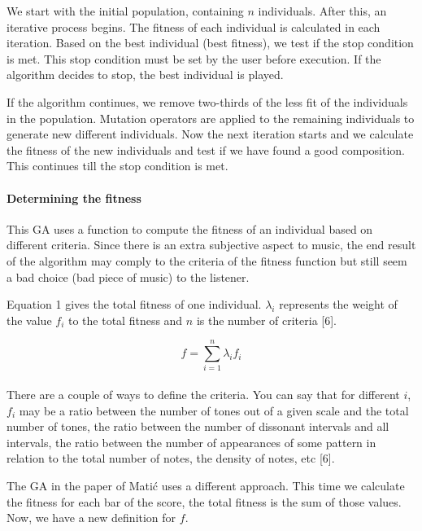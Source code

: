 \documentclass[12pt]{article}
\begin{document}
We start with the initial population, containing $n$ individuals. After this, an iterative process begins. The fitness of each individual is calculated in each iteration. Based on the best individual (best fitness), we test if the stop condition is met. This stop condition must be set by the user before execution. If the algorithm decides to stop, the best individual is played.
\newline

If the algorithm continues, we remove two-thirds of the less fit of the individuals in the population. Mutation operators are applied to the remaining individuals to generate new different individuals. Now the next iteration starts and we calculate the fitness of the new individuals and test if we have found a good composition.
This continues till the stop condition is met.
\newpage

\paragraph{Determining the fitness}

This GA uses a function to compute the fitness of an individual based on different criteria. Since there is an extra subjective aspect to music, the end result of the algorithm may comply to the criteria of the fitness function but still seem a bad choice (bad piece of music) to the listener. 
\newline

Equation 1 gives the total fitness of one individual. $\lambda_i$ represents the weight of the value $f_i$ to the total fitness and $n$ is the number of criteria [6].

\begin{equation}
f = \sum_{i = 1}^{n}\lambda_i f_i
\end{equation}
\\
There are a couple of ways to define the criteria. You can say that for different $i$, $f_i$ may be a ratio between the number of tones out of a given scale and the total number of tones, the ratio between the number of dissonant intervals and all intervals, the ratio between the number of appearances of some pattern in relation to the total number of notes, the density of notes, etc [6]. 
\newline

The GA in the paper of Mati\'c uses a different approach. This time we calculate the fitness for each bar of the score, the total fitness is the sum of those values. Now, we have a new definition for $f$.
\end{document}

